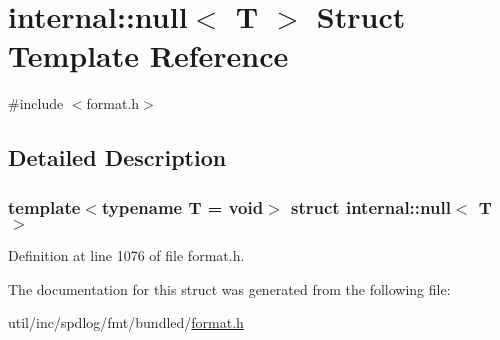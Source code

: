 \hypertarget{structinternal_1_1null}{}\section{internal\+:\+:null$<$ T $>$ Struct Template Reference}
\label{structinternal_1_1null}


{\ttfamily \#include $<$format.\+h$>$}



\subsection{Detailed Description}
\subsubsection*{template$<$typename T = void$>$\newline
struct internal\+::null$<$ T $>$}



Definition at line 1076 of file format.\+h.



The documentation for this struct was generated from the following file\+:\begin{DoxyCompactItemize}
\item 
util/inc/spdlog/fmt/bundled/\hyperlink{format_8h}{format.\+h}\end{DoxyCompactItemize}
